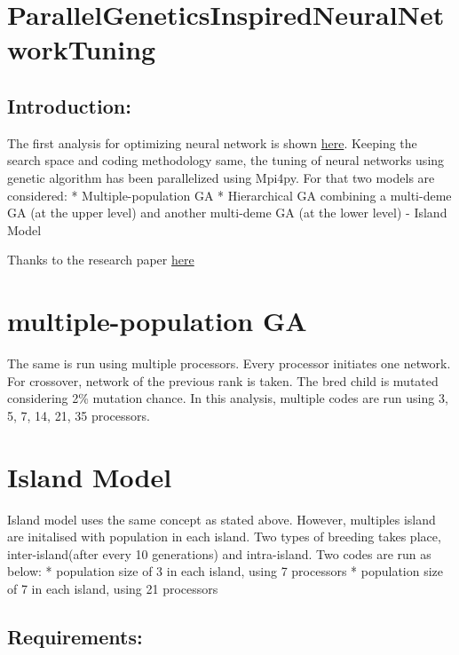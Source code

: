 \documentclass[]{article}
\date{}
\begin{document}
\section{ParallelGeneticsInspiredNeuralNetworkTuning}\label{parallelgeneticsinspiredneuralnetworktuning}

\subsection{Introduction:}\label{introduction}

The first analysis for optimizing neural network is shown
\href{https://github.com/bhatnags/GeneticsInspiredNeuralNetworkTuning}{here}.
Keeping the search space and coding methodology same, the tuning of
neural networks using genetic algorithm has been parallelized using
Mpi4py. For that two models are considered: * Multiple-population GA *
Hierarchical GA combining a multi-deme GA (at the upper level) and
another multi-deme GA (at the lower level) - Island Model

Thanks to the research paper
\href{https://www.researchgate.net/publication/2362670_A_Survey_of_Parallel_Genetic_Algorithms}{here}

\section{multiple-population GA}\label{multiple-population-ga}

The same is run using multiple processors. Every processor initiates one
network. For crossover, network of the previous rank is taken. The bred
child is mutated considering 2\% mutation chance. In this analysis,
multiple codes are run using 3, 5, 7, 14, 21, 35 processors.

\section{Island Model}\label{island-model}

Island model uses the same concept as stated above. However, multiples
island are initalised with population in each island. Two types of
breeding takes place, inter-island(after every 10 generations) and
intra-island. Two codes are run as below: * population size of 3 in each
island, using 7 processors * population size of 7 in each island, using
21 processors

\subsection{Requirements:}\label{requirements}
\end{document}
